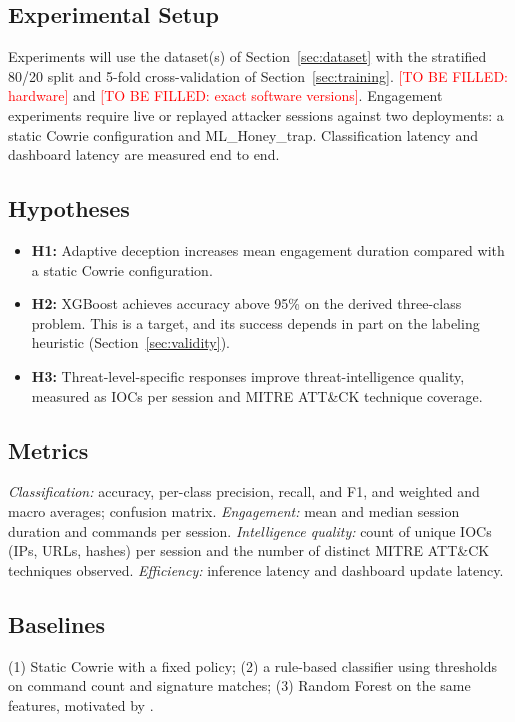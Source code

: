 \documentclass[conference]{IEEEtran}
\newcommand{\tbf}[1]{\textcolor{red}{[TO BE FILLED: #1]}}
\newcommand{\sys}{ML\_Honey\_trap}
\begin{document}
\subsection{Experimental Setup}\label{sec:setup}
Experiments will use the dataset(s) of Section~\ref{sec:dataset} with the stratified 80/20 split and 5-fold cross-validation of Section~\ref{sec:training}. \tbf{hardware} and \tbf{exact software versions}. Engagement experiments require live or replayed attacker sessions against two deployments: a static Cowrie configuration and \sys. Classification latency and dashboard latency are measured end to end.

\subsection{Hypotheses}\label{sec:hyp}
\begin{itemize}
\item \textbf{H1:} Adaptive deception increases mean engagement duration compared with a static Cowrie configuration.
\item \textbf{H2:} XGBoost achieves accuracy above 95\% on the derived three-class problem. This is a target, and its success depends in part on the labeling heuristic (Section~\ref{sec:validity}).
\item \textbf{H3:} Threat-level-specific responses improve threat-intelligence quality, measured as IOCs per session and MITRE ATT\&CK technique coverage.
\end{itemize}

\subsection{Metrics}
\emph{Classification:} accuracy, per-class precision, recall, and F1, and weighted and macro averages; confusion matrix. \emph{Engagement:} mean and median session duration and commands per session. \emph{Intelligence quality:} count of unique IOCs (IPs, URLs, hashes) per session and the number of distinct MITRE ATT\&CK techniques \cite{ref15} observed. \emph{Efficiency:} inference latency and dashboard update latency.

\subsection{Baselines}
(1) Static Cowrie with a fixed policy; (2) a rule-based classifier using thresholds on command count and signature matches; (3) Random Forest on the same features, motivated by \cite{ref4,ref5}.
\end{document}
